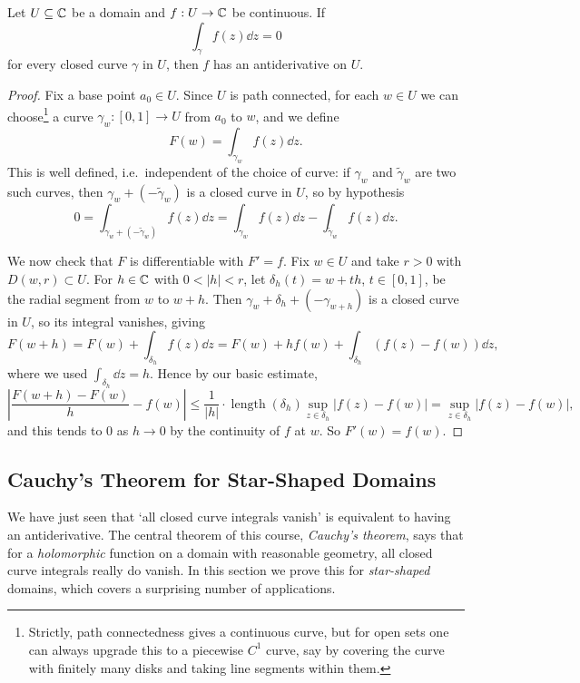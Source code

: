 \documentclass[a4paper]{scrartcl}
\begin{document}
\begin{theorem}
    Let $U \subseteq \mathbb{C}$ be a domain and $f: U \rightarrow \mathbb{C}$ be continuous. If
    $$
    \int_\gamma f(z) \dd z = 0
    $$
    for every closed curve $\gamma$ in $U$, then $f$ has an antiderivative on $U$.
\end{theorem}
\begin{proof}
    Fix a base point $a_0 \in U$. Since $U$ is path connected, for each $w \in U$ we can choose\footnote{Strictly, path connectedness gives a continuous curve, but for open sets one can always upgrade this to a piecewise $C^1$ curve, say by covering the curve with finitely many disks and taking line segments within them.} a curve $\gamma_w: [0, 1] \rightarrow U$ from $a_0$ to $w$, and we define
    $$
    F(w) = \int_{\gamma_w} f(z) \dd z.
    $$
    This is well defined, i.e.\ independent of the choice of curve: if $\gamma_w$ and $\tilde{\gamma}_w$ are two such curves, then $\gamma_w + (-\tilde{\gamma}_w)$ is a closed curve in $U$, so by hypothesis
    $$
    0 = \int_{\gamma_w + (-\tilde{\gamma}_w)} f(z) \dd z = \int_{\gamma_w} f(z) \dd z - \int_{\tilde{\gamma}_w} f(z) \dd z.
    $$

    We now check that $F$ is differentiable with $F' = f$. Fix $w \in U$ and take $r > 0$ with $D(w, r) \subset U$. For $h \in \mathbb{C}$ with $0 < |h| < r$, let $\delta_h(t) = w + th$, $t \in [0, 1]$, be the radial segment from $w$ to $w + h$. Then $\gamma_w + \delta_h + (-\gamma_{w + h})$ is a closed curve in $U$, so its integral vanishes, giving
    $$
    F(w + h) = F(w) + \int_{\delta_h} f(z) \dd z = F(w) + h f(w) + \int_{\delta_h} (f(z) - f(w)) \dd z,
    $$
    where we used $\int_{\delta_h} \dd z = h$. Hence by our basic estimate,
    $$
    \left|\frac{F(w + h) - F(w)}{h} - f(w)\right| \leq \frac{1}{|h|} \cdot \operatorname{length}(\delta_h) \sup_{z \in \delta_h} |f(z) - f(w)| = \sup_{z \in \delta_h} |f(z) - f(w)|,
    $$
    and this tends to $0$ as $h \rightarrow 0$ by the continuity of $f$ at $w$. So $F'(w) = f(w)$.
\end{proof}

\subsection{Cauchy's Theorem for Star-Shaped Domains}

We have just seen that `all closed curve integrals vanish' is equivalent to having an antiderivative. The central theorem of this course, \emph{Cauchy's theorem}, says that for a \emph{holomorphic} function on a domain with reasonable geometry, all closed curve integrals really do vanish. In this section we prove this for \emph{star-shaped} domains, which covers a surprising number of applications.
\end{document}
